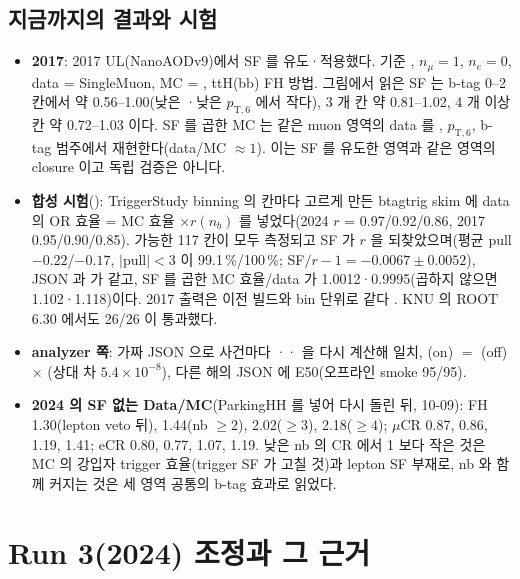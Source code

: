 \subsection{지금까지의 결과와 시험}\label{sec:trigger-tests}

\begin{itemize}
\item \textbf{2017}: 2017 UL(NanoAODv9)에서 SF 를 유도·적용했다. 기준 , $n_\mu=1$, $n_e=0$, data = SingleMuon, MC = \ttbar,
  ttH(bb) FH 방법. 그림에서 읽은 SF 는 b-tag 0--2 칸에서 약 0.56–1.00(낮은 \HT·낮은 $p_{\mathrm{T},6}$ 에서 작다),
  3 개 칸 약 0.81–1.02, 4 개 이상 칸 약 0.72–1.03 이다. SF 를 곱한 MC 는 같은 muon 영역의
  data 를 \HT, $p_{\mathrm{T},6}$, b-tag 범주에서 재현한다(data/MC $\approx 1$). 이는 SF 를 유도한
  영역과 같은 영역의 closure 이고 독립 검증은 아니다\tagours.
\item \textbf{합성 시험}(): TriggerStudy binning 의 칸마다 고르게 만든 btagtrig skim 에 data 의
  OR 효율 = MC 효율 $\times r(n_b)$ 를 넣었다(2024 $r$ = 0.97/0.92/0.86, 2017 0.95/0.90/0.85). 가능한 117 칸이 모두 측정되고 SF 가 $r$ 을
  되찾았으며(평균 pull $-0.22$/$-0.17$, $|$pull$|<3$ 이 99.1\,\%/100\,\%; SF$/r-1 = -0.0067\pm0.0052$), JSON 과  가
  같고, SF 를 곱한 MC 효율/data 가 1.0012·0.9995(곱하지 않으면 1.102·1.118)이다. 2017 출력은 이전 빌드와 bin 단위로 같다
  \tagtest. KNU 의 ROOT 6.30 에서도 26/26 이 통과했다.
\item \textbf{analyzer 쪽}: 가짜 JSON 으로 사건마다 ·· 을 다시 계산해 일치, (on) $=$
  (off) $\times$ (상대 차 $5.4\times10^{-8}$), 다른 해의 JSON 에 E50(오프라인 smoke 95/95)\tagtest.
\item \textbf{2024 의 SF 없는 Data/MC}(ParkingHH 를 넣어 다시 돌린 뒤, 10-09): FH 1.30(lepton veto 뒤), 1.44(nb $\geq 2$), 2.02($\geq 3$),
  2.18($\geq 4$); $\mu$CR 0.87, 0.86, 1.19, 1.41; eCR 0.80, 0.77, 1.07, 1.19. 낮은 nb 의 CR 에서 1 보다 작은 것은 MC 의 강입자 trigger
  효율(trigger SF 가 고칠 것)과 lepton SF 부재로, nb 와 함께 커지는 것은 세 영역 공통의 b-tag 효과로 읽었다.
\end{itemize}

\section{Run 3(2024) 조정과 그 근거}\label{sec:trigger-run3}

